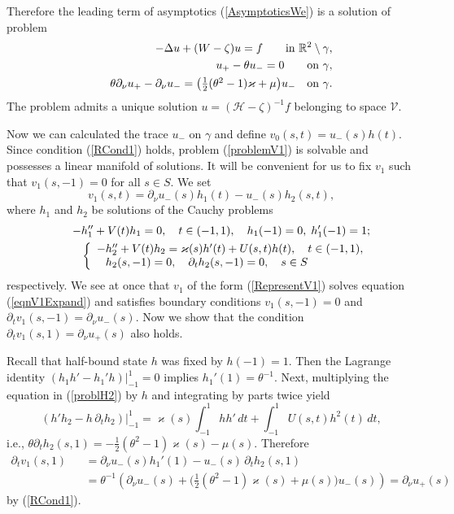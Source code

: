 \documentclass[graybox]{svmult}
\renewcommand{\kappa}{\varkappa}
\newcommand{\Real}{\mathbb R}
\newcommand{\eqref}[1]{(\ref{#1})}
\begin{document}
Therefore the leading term of asymptotics \eqref{AsymptoticsWe} is a solution of problem
\begin{eqnarray}\nonumber   %
&&-\Delta u+(W-\zeta)u=f \qquad \hbox{in  } \Real^2\setminus \gamma,
\\ \nonumber %
 &&\phantom{-}u_+-\theta u_-=0  \qquad \hbox{on } \gamma,
\\ \nonumber
&&\phantom{-}\theta\partial_\nu u_+-\partial_\nu u_-
=\big(\textstyle\frac{1}{2}(\theta^2-1)\kappa+\mu \big) u_- \quad \hbox{on } \gamma.
\end{eqnarray}
The problem admits a unique solution $u=(\mathcal{H}-\zeta)^{-1}f$ belonging to space $\mathcal{V}$.

Now we can calculated the trace $u_-$ on $\gamma$ and  define $v_0(s,t)=u_-(s)h(t)$. Since  condition \eqref{RCond1} holds,
problem \eqref{problemV1} is solvable and possesses a li\-near manifold of
solutions. It will be convenient for us to fix $v_1$ such that $v_1(s,-1)=0$ for all $s\in S$. We set
\begin{equation}\label{RepresentV1}
  v_1(s,t)=\partial_\nu u_-(s)h_1(t)-u_-(s)h_2(s,t),
\end{equation}
where $h_1$ and $h_2$ be solutions of the Cauchy problems
\begin{eqnarray}\nonumber
&&\kern8pt-h_1''+V(t)h_1=0,\quad t\in (-1,1),\quad  h_1(-1)=0, \; h_1'(-1)=1;\\
&&
\left\{
\begin{array}{ll}
-h_2''+V(t)h_2=\kappa(s)h'(t)+U(s,t)h(t),\quad t\in (-1,1),\\\label{problH2}
\phantom{-}h_2(s,-1)=0, \quad \partial_th_2(s,-1)=0,\quad s\in S
\end{array}
\right.
\end{eqnarray}
respectively.
We see at once that  $v_1$ of the form \eqref{RepresentV1} solves equation \eqref{eqnV1Expand} and satisfies boundary conditions $v_1(s,-1)=0$ and $\partial_t v_1(s, -1)=\partial_\nu u_-(s)$. Now we show that the condition $\partial_t v_1(s, 1)=\partial_\nu u_+(s)$ also holds.

Recall that half-bound state $h$ was fixed by  $h(-1)=1$. Then 
the Lagrange identity $(h_1h'-h_1'h)|_{-1}^1=0$ implies  $h_1'(1)=\theta^{-1}$.
Next, multiplying the equation in \eqref{problH2} by $h$ and  integrating by parts twice yield
$$
 (h'h_2-h\,\partial_th_2)\big|_{-1}^1=\kappa(s)\int_{-1}^1hh'\,dt
  +\int_{-1}^1U(s,t)h^2(t)\, dt,
$$
i.e., $\theta \partial_th_2(s,1)=-\frac{1}{2 }(\theta^2-1)\kappa(s)-\mu(s)$.
Therefore
\begin{eqnarray}\nonumber
\partial_t v_1(s,1)&&=\partial_\nu u_-(s)h_1'(1)- u_-(s)\,\partial_th_2(s,1)\\\nonumber
&&=\theta^{-1} \left(\partial_\nu u_-(s)+\big(\textstyle\frac{1}{2 }(\theta^2-1)\kappa(s)+\mu(s)\big)u_-(s)\right)=\partial_\nu u_+(s)
\end{eqnarray}
by \eqref{RCond1}.
\end{document}
